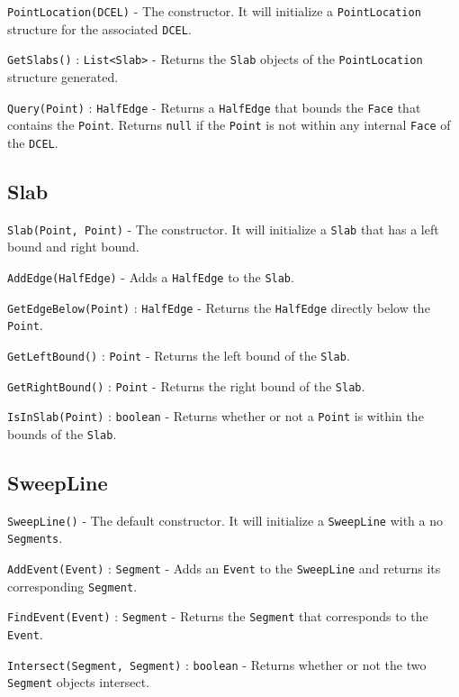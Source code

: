 \documentclass[11pt]{article}
\begin{document}
\texttt{PointLocation(DCEL)} - The constructor. It will initialize a \texttt{PointLocation} structure for the associated \texttt{DCEL}.

\texttt{GetSlabs()} : \texttt{List<Slab>} - Returns the \texttt{Slab} objects of the \texttt{PointLocation} structure generated.
 
\texttt{Query(Point)} : \texttt{HalfEdge} - Returns a \texttt{HalfEdge} that bounds the \texttt{Face} that contains the \texttt{Point}. Returns \texttt{null} if the \texttt{Point} is not within any internal \texttt{Face} of the \texttt{DCEL}.

\subsection{Slab}
\label{sec:slab}

\texttt{Slab(Point, Point)} - The constructor. It will initialize a \texttt{Slab} that has a left bound and right bound.

\texttt{AddEdge(HalfEdge)} - Adds a \texttt{HalfEdge} to the \texttt{Slab}.

\texttt{GetEdgeBelow(Point)} : \texttt{HalfEdge} - Returns the \texttt{HalfEdge} directly below the \texttt{Point}.

\texttt{GetLeftBound()} : \texttt{Point} - Returns the left bound of the \texttt{Slab}.

\texttt{GetRightBound()} : \texttt{Point} - Returns the right bound of the \texttt{Slab}.

\texttt{IsInSlab(Point)} : \texttt{boolean} - Returns whether or not a \texttt{Point} is within the bounds of the \texttt{Slab}.

\subsection{SweepLine}
\label{sec:sweepline}

\texttt{SweepLine()} - The default constructor. It will initialize a \texttt{SweepLine} with a no \texttt{Segments}.

\texttt{AddEvent(Event)} : \texttt{Segment} - Adds an \texttt{Event} to the \texttt{SweepLine} and returns its corresponding \texttt{Segment}.

\texttt{FindEvent(Event)} : \texttt{Segment} - Returns the \texttt{Segment} that corresponds to the \texttt{Event}.

\texttt{Intersect(Segment, Segment)} : \texttt{boolean} - Returns whether or not the two \texttt{Segment} objects intersect.
\end{document}
